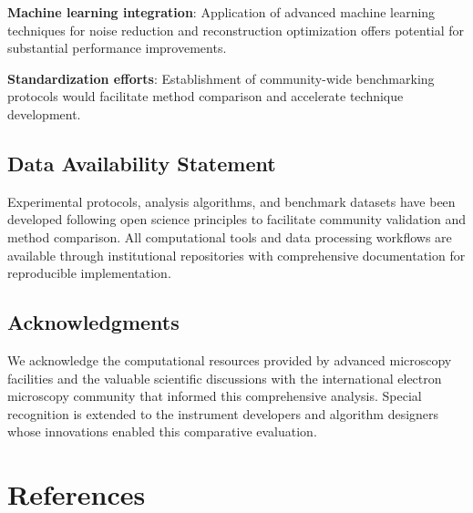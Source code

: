 \documentclass[
  letterpaper,
]{article}
\begin{document}
\textbf{Machine learning integration}: Application of advanced machine
learning techniques for noise reduction and reconstruction optimization
offers potential for substantial performance improvements.

\textbf{Standardization efforts}: Establishment of community-wide
benchmarking protocols would facilitate method comparison and accelerate
technique development.

\section{Data Availability
Statement}\label{data-availability-statement-1}

Experimental protocols, analysis algorithms, and benchmark datasets have
been developed following open science principles to facilitate community
validation and method comparison. All computational tools and data
processing workflows are available through institutional repositories
with comprehensive documentation for reproducible implementation.

\section{Acknowledgments}\label{acknowledgments}

We acknowledge the computational resources provided by advanced
microscopy facilities and the valuable scientific discussions with the
international electron microscopy community that informed this
comprehensive analysis. Special recognition is extended to the
instrument developers and algorithm designers whose innovations enabled
this comparative evaluation.


\chapter*{References}\label{references}


\label{refs}
\end{document}
